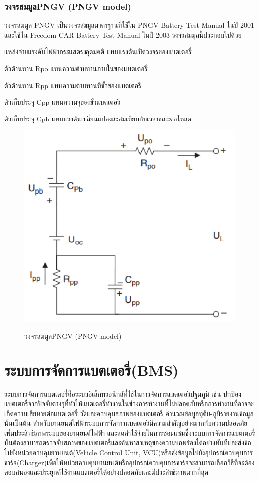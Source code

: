 \subsubsection*{วงจรสมมูลPNGV (PNGV model)}
วงจรสมมูล PNGV เป็นวงจรสมมูลมาตรฐานที่ใช้ใน PNGV Battery Test Manual ในปี 2001 และใช้ใน Freedom CAR Battery Test Manual
 ในปี 2003 วงจรสมมูลนี้ประกอบไปด้วย
\begin{itemize}
	{\item 	แหล่งจ่ายแรงดันไฟฟ้ากระแสตรงอุดมคติ แทนแรงดันเปิดวงจรของแบตเตอรี่}
	{\item 	ตัวต้านทาน Rpo แทนความต้านทานภายในของแบตเตอรี่}
	{\item 	ตัวต้านทาน Rpp แทนความต้านทานที่ขั้วของแบตเตอรี่}
	{\item 	ตัวเก็บประจุ Cpp แทนความจุของขั้วแบตเตอรี่}
	{\item 	ตัวเก็บประจุ Cpb แทนแรงดันเปลี่ยนแปลงสะสมเทียบกับเวลาขณะต่อโหลด}
\end{itemize}
\begin{center}
	\begin{figure}[H]
		\includegraphics[width=0.6\linewidth]{Chapters/img/PNGV_model.png}
			\centering
			\captionsetup{justification=centering,margin=2cm}
			\caption{วงจรสมมูลPNGV (PNGV model)}
			\cite{jiangzhang2015}
	\end{figure}
\end{center}
\section{ระบบการจัดการแบตเตอรี่(BMS)}
ระบบการจัดการแบตเตอรี่คือระบบอิเล็กทรอนิกส์ที่ใช้ในการจัดการแบตเตอรี่ปฐมภูมิ เช่น ปกป้องแบตเตอรี่จากปัจจัยต่างๆที่ทำให้แบตเตอรี่ทำงานในช่วงการทำงานที่ไม่ปลอดภัยหรือการทำงานที่อาจจะเกิดความเสียหายต่อแบตเตอรี่ 
วัดและควบคุมสภาพของแบตเตอรี่ คำนวณข้อมูลทุติย-ภูมิรายงานข้อมูลนั้นเป็นต้น
สำหรับยานยนต์ไฟฟ้าระบบการจัดการแบตเตอรี่มีความสำคัญอย่างมากกับความปลอดภัย เพิ่มประสิทธิภาพระบบของยานยนต์ไฟฟ้า และลดค่าใช้จ่ายในการซ่อมแซมซึ่งระบบการจัดการแบตเตอรี่นั้นต้องสามารถตรวจจับสภาพของแบตเตอรี่และค้นหาสาเหตุของความบกพร่องได้อย่างทันทีและส่งข้อไปยังหน่วยควบคุมยานยนต์(Vehicle Control Unit, VCU)หรือส่งข้อมูลไปยังอุปกรณ์ควบคุมการชาร์จ(Charger)เพื่อให้หน่วยควบคุมยานยนต์หรืออุปกรณ์ควบคุมการชาร์จจะสามารถเลือกวิธีที่จะต้องตอบสนองและประยุกต์ใช้งานแบตเตอรี่ได้อย่างปลอดภัยและมีประสิทธิภาพมากที่สุด
